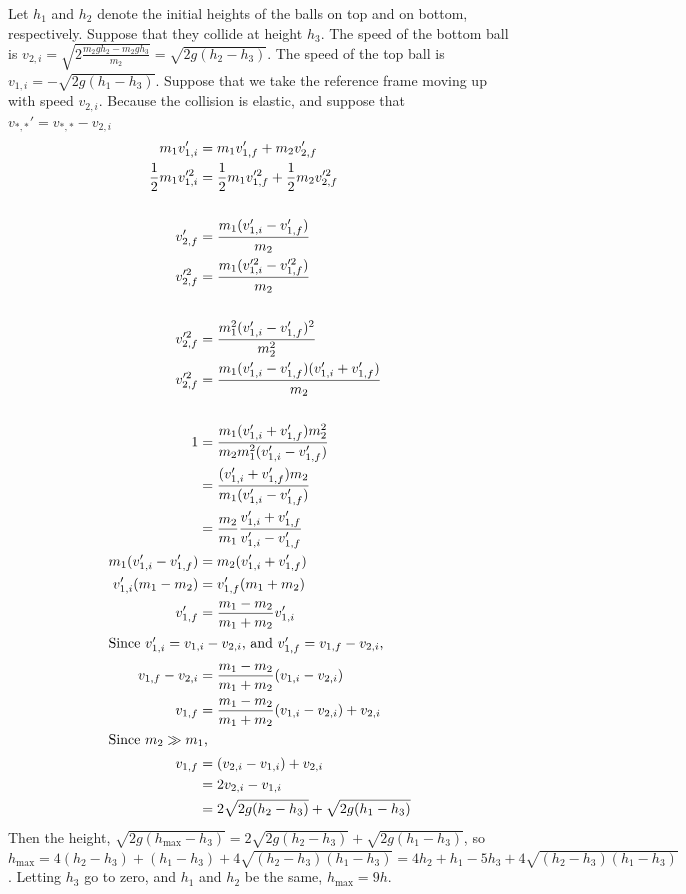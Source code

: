 \documentclass{esg8012pset}
\begin{document}
\begin{solution}
  Let $h_1$ and $h_2$ denote the initial heights of the balls on top and on bottom, respectively.  Suppose that they collide at height $h_3$.  The speed of the bottom ball is $v_{2, i} = \sqrt{2\frac{m_2gh_2 - m_2 g h_3}{m_2}} = \sqrt{2g(h_2 - h_3)}$.  The speed of the top ball is $v_{1, i} = -\sqrt{2g(h_1-h_3)}$.  Suppose that we take the reference frame moving up with speed $v_{2, i}$.  Because the collision is elastic, and suppose that $v_{*, *}' = v_{*, *} - v_{2, i}$ \begin{align*}
    m_1 v_{1,i}' & = m_1 v_{1,f}' + m_2 v_{2,f}' \\
    \frac{1}{2}m_1 v_{1,i}'^2 & = \frac{1}{2}m_1 v_{1,f}'^2 + \frac{1}{2}m_2 v_{2,f}'^2 \\
    \\
    v_{2,f}' & =  \frac{m_1(v_{1,i}' - v_{1,f}')}{m_2} \\
    v_{2,f}'^2 & = \frac{m_1(v_{1,i}'^2 - v_{1,f}'^2)}{m_2} \\
    \\
    v_{2,f}'^2 & = \frac{m_1^2(v_{1,i}' - v_{1,f}')^2}{m_2^2} \\
    v_{2,f}'^2 & = \frac{m_1(v_{1,i}' - v_{1,f}')(v_{1,i}' + v_{1,f}')}{m_2} \\
    \\
    1 & = \frac{m_1(v_{1,i}' + v_{1,f}') m_2^2}{m_2 m_1^2 (v_{1,i}' - v_{1,f}')} \\
      & = \frac{(v_{1,i}' + v_{1,f}') m_2}{m_1 (v_{1,i}' - v_{1,f}')} \\
      & = \frac{m_2}{m_1}\frac{v_{1,i}' + v_{1,f}'}{v_{1,i}' - v_{1,f}'} \\
    m_1(v_{1,i}' - v_{1,f}') & = m_2(v_{1,i}' + v_{1,f}') \\
    v_{1,i}'(m_1 - m_2) & =  v_{1,f}'(m_1 + m_2) \\
    v_{1, f}' & = \frac{m_1 - m_2}{m_1 + m_2}v_{1,i}' \\
    \intertext{Since $v_{1, i}' = v_{1, i} - v_{2, i}$, and $v_{1, f}' = v_{1, f} - v_{2, i}$,}
    v_{1, f} - v_{2, i} & = \frac{m_1 - m_2}{m_1 + m_2}(v_{1, i} - v_{2, i}) \\
    v_{1, f} & = \frac{m_1 - m_2}{m_1 + m_2}(v_{1, i} - v_{2, i}) + v_{2, i} \\
    \intertext{Since $m_2\gg m_1$,}
    v_{1, f} & = (v_{2, i} - v_{1, i}) + v_{2, i} \\
    & = 2v_{2, i} - v_{1, i} \\
    & = 2\sqrt{2g(h_2 - h_3)} + \sqrt{2g(h_1-h_3)}
    \end{align*}
    Then the height, $\sqrt{2g(h_{\text{max}} - h_3)} = 2\sqrt{2g(h_2 - h_3)} + \sqrt{2g(h_1-h_3)}$, so $h_{\text{max}} = 4(h_2 - h_3) + (h_1 - h_3) + 4\sqrt{(h_2 - h_3)(h_1 - h_3)} = 4h_2 + h_1 - 5h_3 + 4\sqrt{(h_2 - h_3)(h_1 - h_3)}$.  Letting $h_3$ go to zero, and $h_1$ and $h_2$ be the same, $h_{\text{max}} = 9h$.
\end{solution}
\end{document}
